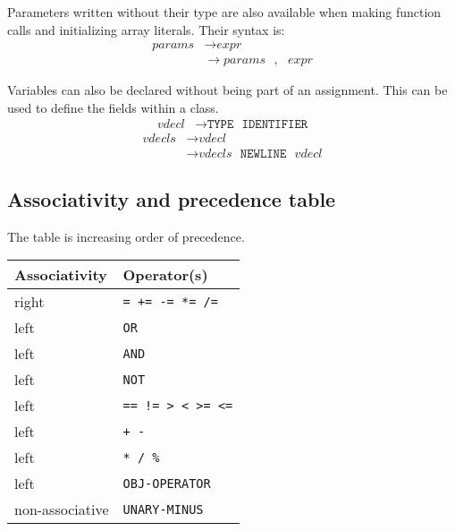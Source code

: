 \documentclass{article}
\begin{document}
Parameters written without their type are also available when making function calls and initializing array literals. Their syntax is:
\label{sec:params}
\begin{align*}
    \textit{params} &\to \hyperref[sec:expr]{\textit{expr}} \\
    &\to \hyperref[sec:params]{\textit{params}} \texttt{ } , \texttt{ } \hyperref[sec:expr]{\textit{expr}}
\end{align*}

Variables can also be declared without being part of an assignment. This can be used to define the fields within a class.
\label{sec:vdecl}
\begin{align*}
    \textit{vdecl} &\to \texttt{TYPE} \texttt{ } \texttt{IDENTIFIER}
\end{align*}
\label{sec:vdecls}
\begin{align*}
    \textit{vdecls} &\to \hyperref[sec:vdecl]{\textit{vdecl}} \\ &\to \hyperref[sec:vdecls]{\textit{vdecls}} \texttt{ } \texttt{NEWLINE} \texttt{ } \hyperref[sec:vdecl]{\textit{vdecl}}
\end{align*}

\subsection{Associativity and precedence table}
The table is increasing order of precedence.

\begin{table}[h]
\centering
\begin{tabular}{|l|l|}
\hline
Associativity   & Operator(s) \\ \hline
right           & \texttt{= += -= *= /=} \\ \hline
left            & \texttt{OR} \\ \hline
left            & \texttt{AND} \\ \hline
left            & \texttt{NOT} \\ \hline
left            & \texttt{== != > < >= <=} \\ \hline
left            & \texttt{+ -} \\ \hline
left            & \texttt{* / \%} \\ \hline
left            & \texttt{OBJ-OPERATOR} \\ \hline
non-associative & \texttt{UNARY-MINUS} \\
\hline
\end{tabular}
\end{table}
\end{document}
